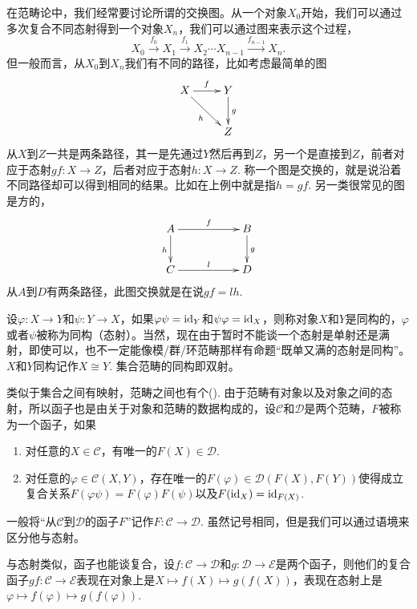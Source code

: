 \para 在范畴论中，我们经常要讨论所谓的交换图。从一个对象$X_0$开始，我们可以通过多次复合不同态射得到一个对象$X_n$，我们可以通过图来表示这个过程，
\[
	X_0\xrightarrow{f_0} X_1\xrightarrow{f_1} X_2\cdots X_{n-1}\xrightarrow{f_{n-1}} X_n.
\]
但一般而言，从$X_0$到$X_n$我们有不同的路径，比如考虑最简单的图
\[
\begin{xy}
	\xymatrix{
		X\ar[r]^{f} \ar[dr]_{h}&Y \ar[d]^{g}\\
		&Z
	}
\end{xy}
\]
从$X$到$Z$一共是两条路径，其一是先通过$Y$然后再到$Z$，另一个是直接到$Z$，前者对应于态射$gf:X\to Z$，后者对应于态射$h:X\to Z$. 称一个图是交换的，就是说沿着不同路径却可以得到相同的结果。比如在上例中就是指$h=gf$. 另一类很常见的图是方的，
\[
\begin{xy}
	\xymatrix{
		A\ar[rr]^{f} \ar[d]_{h}&&B \ar[d]^{g}\\
		C\ar[rr]^{l}&&D
	}
\end{xy}
\]
从$A$到$D$有两条路径，此图交换就是在说$gf=lh$.

\para 设$\varphi:X\to Y$和$\psi:Y\to X$，如果$\varphi\psi=\operatorname{id}_Y$和$\psi\varphi=\operatorname{id}_X$，则称对象$X$和$Y$是同构的，$\varphi$或者$\psi$被称为同构（态射）。当然，现在由于暂时不能谈一个态射是单射还是满射，即使可以，也不一定能像模/群/环范畴那样有命题“既单又满的态射是同构”。$X$和$Y$同构记作$X\cong Y$. 集合范畴的同构即双射。

\para 类似于集合之间有映射，范畴之间也有个(). 由于范畴有对象以及对象之间的态射，所以函子也是由关于对象和范畴的数据构成的，设$\mathcal{C}$和$\mathcal{D}$是两个范畴，$F$被称为一个函子，如果
\begin{enumerate}
	\item 对任意的$X\in \mathcal{C}$，有唯一的$F(X)\in \mathcal{D}$.
	
	\item 对任意的$\varphi\in \mathcal{C}(X,Y)$，存在唯一的$F(\varphi)\in  \mathcal{D}(F(X),F(Y))$使得成立复合关系$F(\varphi\psi)=F(\varphi)F(\psi)$以及$F(\operatorname{id}_X)=\operatorname{id}_{F(X)}$.
\end{enumerate}

一般将“从$\mathcal{C}$到$\mathcal{D}$的函子$F$”记作$F:\mathcal{C}\to \mathcal{D}$. 虽然记号相同，但是我们可以通过语境来区分他与态射。

与态射类似，函子也能谈复合，设$f:\mathcal{C}\to \mathcal{D}$和$g:\mathcal{D}\to \mathcal{E}$是两个函子，则他们的复合函子$gf:\mathcal{C}\to \mathcal{E}$表现在对象上是$X\mapsto f(X)\mapsto g(f(X))$，表现在态射上是$\varphi\mapsto f(\varphi)\mapsto g(f(\varphi))$. 

